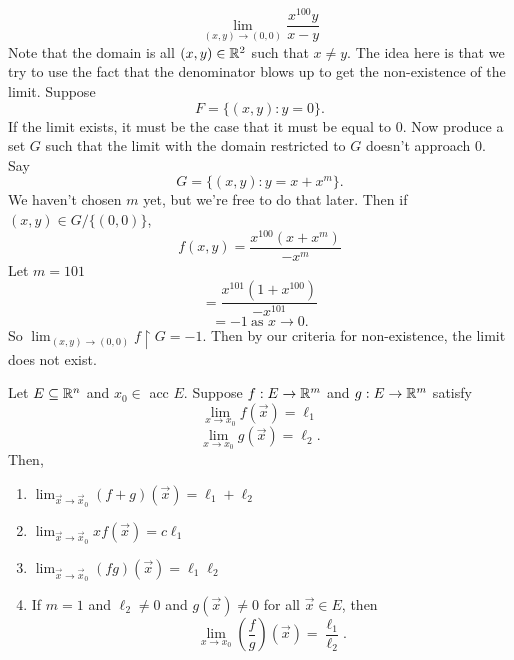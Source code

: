 \documentclass[11pt]{article}
\newcommand{\x}{\vec{x}}
\newcommand{\ra}{\rightarrow}
\newcommand{\sse}{\subseteq}
\begin{document}
\begin{example}
    \[\lim_{(x,y) \ra (0,0)} \frac{x^{100}y}{x-y}\]
    Note that the domain is all $(x,y) \in \mathbb{R}^2$ such that $x \neq y$. The idea here is that we try to use the fact that the denominator blows up to get the non-existence of the limit. Suppose \[F = \{(x,y): y=0\}.\] If the limit exists, it must be the case that it must be equal to $0$. Now produce a set $G$ such that the limit with the domain restricted to $G$ doesn't approach $0$. Say 
    \[G = \{(x,y) : y = x + x^m\}.\]
    We haven't chosen $m$ yet, but we're free to do that later. Then if $(x,y) \in G / \{(0,0)\}$, 
    \[f(x,y) = \frac{x^{100}(x + x^{m})}{-x^m}\]
    Let $m = 101$
    \[ = \frac{x^{101}(1 + x^{100})}{-x^{101}}\]
    \[ = -1 \ \text{as $x \ra 0.$}\]
    So $\displaystyle{\lim_{(x,y) \ra (0,0)} f \upharpoonright G = -1}$. Then by our criteria for non-existence, the limit does not exist.
\end{example}

\begin{theorem}
    Let $E \sse \R^n$ and $x_0 \in$ acc $E$. Suppose $f: E \ra \R^m$ and $g: E \ra \R^m$ satisfy \[\lim_{x \ra x_0} f(\x) = \ell_1\]
    \[\lim_{x \ra x_0} g(\x) = \ell_2.\]
    Then, \begin{enumerate}
        \item $\displaystyle{\lim_{\x \ra \x_0} (f + g)(\x) = \ell_1 + \ell_2}$
        \item $\displaystyle{\lim_{\x \ra \x_0} xf(\x) = c\ell_1}$
        \item $\displaystyle{\lim_{\x \ra \x_0} (fg)(\x) = \ell_1\ell_2}$
        \item If $m =1$ and $\ell_2 \neq 0$ and $g(\x) \neq 0$ for all $\x \in E$, then \[\lim_{x \ra x_0} \left(\frac{f}{g}\right) (\x) = \frac{\ell_1}{\ell_2}.\]

    \end{enumerate}
\end{theorem}
\end{document}
